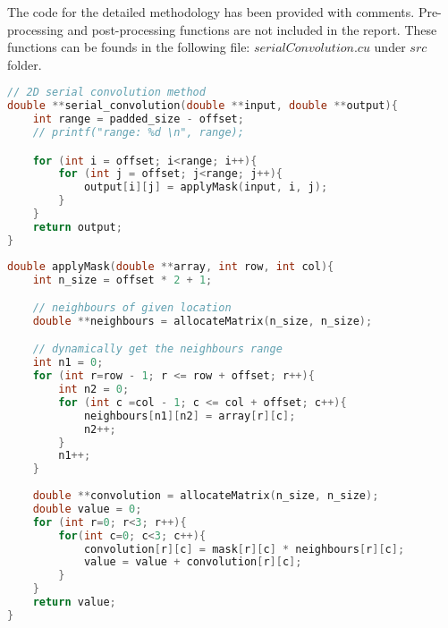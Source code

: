 The code for the detailed methodology has been provided with comments. Pre-processing and post-processing functions are not included in the report. These functions can be founds in the following file: $serialConvolution.cu$ under $src$ folder.

\begin{lstlisting}[language=C, label={lst: serial_convolution}, caption= Add zero padding to the image]
// 2D serial convolution method
double **serial_convolution(double **input, double **output){
    int range = padded_size - offset;
    // printf("range: %d \n", range);

    for (int i = offset; i<range; i++){
        for (int j = offset; j<range; j++){
            output[i][j] = applyMask(input, i, j);
        }
    }
    return output;
}
\end{lstlisting}

\begin{lstlisting}[language=C, label={lst: applyMask}, caption= Apply convolution mask to the given pixel]
double applyMask(double **array, int row, int col){
    int n_size = offset * 2 + 1;

    // neighbours of given location
    double **neighbours = allocateMatrix(n_size, n_size);

    // dynamically get the neighbours range
    int n1 = 0;
    for (int r=row - 1; r <= row + offset; r++){
        int n2 = 0;
        for (int c =col - 1; c <= col + offset; c++){
            neighbours[n1][n2] = array[r][c];
            n2++;
        }
        n1++;
    }
    
    double **convolution = allocateMatrix(n_size, n_size);
    double value = 0;
    for (int r=0; r<3; r++){
        for(int c=0; c<3; c++){
            convolution[r][c] = mask[r][c] * neighbours[r][c];
            value = value + convolution[r][c];
        }
    }
    return value;
}
\end{lstlisting}


